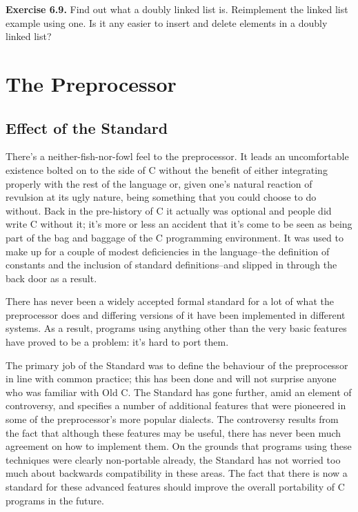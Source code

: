   \textbf{Exercise 6.9.} Find out what a doubly linked list is. Reimplement the
   linked list example using one. Is it any easier to insert and delete
   elements in a doubly linked list?


   \chapter{The Preprocessor}\label{chap:preproc}


   \section{Effect of the Standard}


   There's a neither-fish-nor-fowl feel to the preprocessor. It leads an
   uncomfortable existence bolted on to the side of C without the benefit of
   either integrating properly with the rest of the language or, given one's
   natural reaction of revulsion at its ugly nature, being something that
   you could choose to do without. Back in the pre-history of C it actually
   was optional and people did write C without it; it's more or less an
   accident that it's come to be seen as being part of the bag and baggage
   of the C programming environment. It was used to make up for a couple of
   modest deficiencies in the language--the definition of constants and
   the inclusion of standard definitions--and slipped in through the
   back door as a result.


   There has never been a widely accepted formal standard for a lot of
   what the preprocessor does and differing versions of it have been
   implemented in different systems. As a result, programs using anything
   other than the very basic features have proved to be a problem:
   it's hard to port them.


   The primary job of the Standard was to define the behaviour of the
   preprocessor in line with common practice; this has been done and will
   not surprise anyone who was familiar with Old C. The Standard has gone
   further, amid an element of controversy, and specifies a number of
   additional features that were pioneered in some of the preprocessor's
   more popular dialects. The controversy results from the fact that
   although these features may be useful, there has never been much
   agreement on how to implement them. On the grounds that programs using
   these techniques were clearly non-portable already, the Standard has not
   worried too much about backwards compatibility in these areas. The fact
   that there is now a standard for these advanced features should improve
   the overall portability of C programs in the future.


